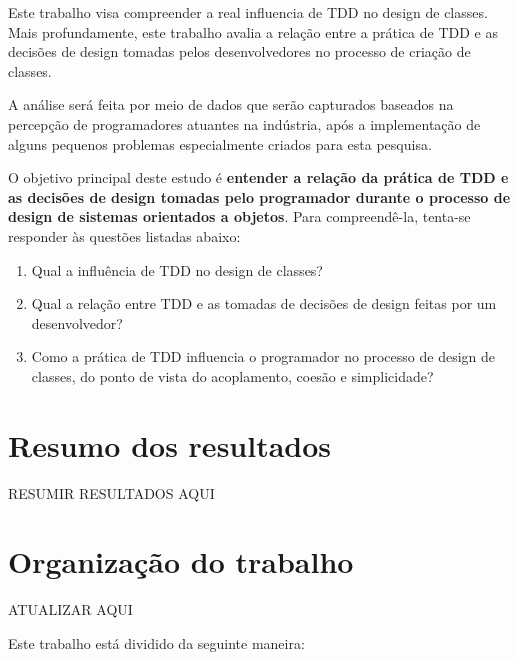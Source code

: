 Este trabalho
visa compreender a real influencia de TDD no design de classes.
Mais profundamente, este trabalho avalia a relação entre a prática de 
TDD
e as decisões de design tomadas pelos desenvolvedores no processo de 
criação de classes.

A análise será feita por meio de dados que serão
capturados baseados na percepção de programadores atuantes na indústria, após
a implementação de alguns pequenos problemas especialmente criados para
esta pesquisa.

O objetivo principal deste estudo é \textbf{entender a relação da prática de TDD 
e as decisões de design tomadas pelo programador durante o processo de 
design de sistemas orientados a objetos}.
Para compreendê-la, tenta-se responder às questões listadas
abaixo:

\begin{enumerate}

	\item Qual a influência de TDD no design de classes?

	\item Qual a relação entre TDD e as tomadas de decisões de design
	feitas por um desenvolvedor?

	\item Como a prática de TDD influencia o programador no processo de  
	design de classes, do ponto de vista do acoplamento, coesão e simplicidade?

\end{enumerate}

\section{Resumo dos resultados}

RESUMIR RESULTADOS AQUI

\section{Organização do trabalho}

ATUALIZAR AQUI

Este trabalho está dividido da seguinte maneira: 

